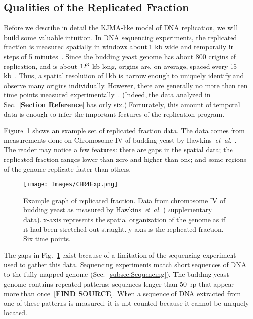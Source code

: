 	
		\subsection{Qualities of the Replicated Fraction}
		\label{subsec:QualitiesReplicatedFraction}
		
		Before we describe in detail the KJMA-like model of DNA replication, we will build some valuable intuition.
		In DNA sequencing experiments, the replicated fraction is measured spatially in windows about 1 kb wide and temporally in steps of 5 minutes~\cite{StochasticTermination}.
		Since the budding yeast genome has about 800 origins of replication, and is about $12\time10^3$ kb long, origins are, on average, spaced every 15 kb~\cite{OriDB,BuddingYeastSequence}.
		Thus, a spatial resolution of 1kb is narrow enough to uniquely identify and observe many origins individually. 
		However, there are generally no more than ten time points measured experimentally~\cite{StochasticTermination,DeepSeq,McCuneMicroArray}.
		(Indeed, the data analyzed in Sec.~[\textbf{Section Reference}] has only six.)
		Fortunately, this amount of temporal data is enough to infer the important features of the replication program.
		
		Figure~\ref{fig:ReplicatedFractionExample} shows an example set of replicated fraction data.
		The data comes from measurements done on Chromosome IV of budding yeast by Hawkins~\emph{et~al.}~\cite{StochasticTermination}.
		The reader may notice a few features:
		there are gaps in the spatial data;
		the replicated fraction ranges lower than zero and higher than one;
		and some regions of the genome replicate faster than others.
		
		\begin{figure}[tbh]
			\begin{center}
				\texttt{[image: Images/CHR4Exp.png]}
			\end{center}
				\caption[Budding yeast Chromosome IV replicated fraction]{\label{fig:ReplicatedFractionExample} Example graph of replicated fraction.
					Data from chromosome IV of budding yeast as measured by Hawkins~\emph{et~al.} (\cite{StochasticTermination} supplementary data).
					x-axis represents the spatial organization of the genome as if it had been stretched out straight.
					y-axis is the replicated fraction.
					Six time points.
				}
		\end{figure}
		
		The gaps in Fig.~\ref{fig:ReplicatedFractionExample} exist because of a limitation of the sequencing experiment used to gather this data.
		Sequencing experiments match short sequences of DNA to the fully mapped genome (Sec.~\ref{subsec:Sequencing}).
		The budding yeast genome contains repeated patterns: sequences longer than 50 bp that appear more than once~[\textbf{FIND SOURCE}].
		When a sequence of DNA extracted from one of these patterns is measured, it is not counted because it cannot be uniquely located.
		
